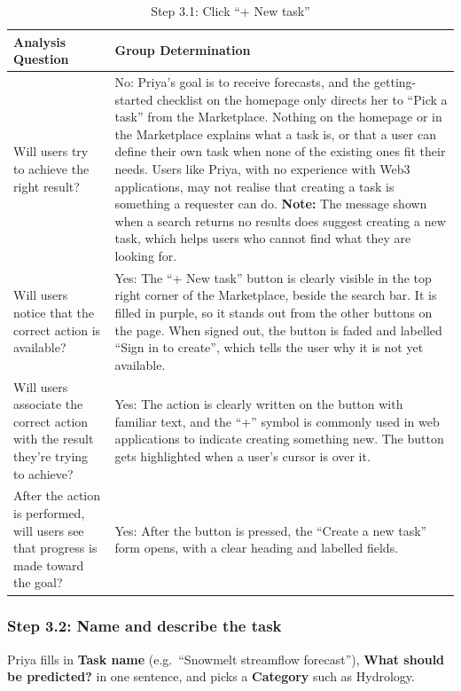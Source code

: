 \documentclass{article}
\begin{document}
\begin{table}[H]
    \centering
    \begin{tabularx}{\textwidth}{|p{5.5cm}|X|}
        \hline
        \textbf{Analysis Question} & \textbf{Group Determination} \\
        \hline
        Will users try to achieve the right result? & No: Priya's goal is to receive forecasts, and the getting-started checklist on the homepage only directs her to ``Pick a task'' from the Marketplace. Nothing on the homepage or in the Marketplace explains what a task is, or that a user can define their own task when none of the existing ones fit their needs. Users like Priya, with no experience with Web3 applications, may not realise that creating a task is something a requester can do. \newline \textbf{Note:} The message shown when a search returns no results does suggest creating a new task, which helps users who cannot find what they are looking for. \\
        \hline
        Will users notice that the correct action is available? & Yes: The ``+ New task'' button is clearly visible in the top right corner of the Marketplace, beside the search bar. It is filled in purple, so it stands out from the other buttons on the page. When signed out, the button is faded and labelled ``Sign in to create'', which tells the user why it is not yet available. \\
        \hline
        Will users associate the correct action with the result they're trying to achieve? & Yes: The action is clearly written on the button with familiar text, and the ``+'' symbol is commonly used in web applications to indicate creating something new. The button gets highlighted when a user's cursor is over it. \\
        \hline
        After the action is performed, will users see that progress is made toward the goal? & Yes: After the button is pressed, the ``Create a new task'' form opens, with a clear heading and labelled fields. \\
        \hline
    \end{tabularx}
    \caption{Step 3.1: Click ``+ New task''}
    \label{tab:cw-step-3-1}
\end{table}

\subsubsection{Step 3.2: Name and describe the task}
Priya fills in \textbf{Task name} (e.g.\ ``Snowmelt streamflow forecast''), \textbf{What should be predicted?} in one sentence, and picks a \textbf{Category} such as Hydrology.
\end{document}

